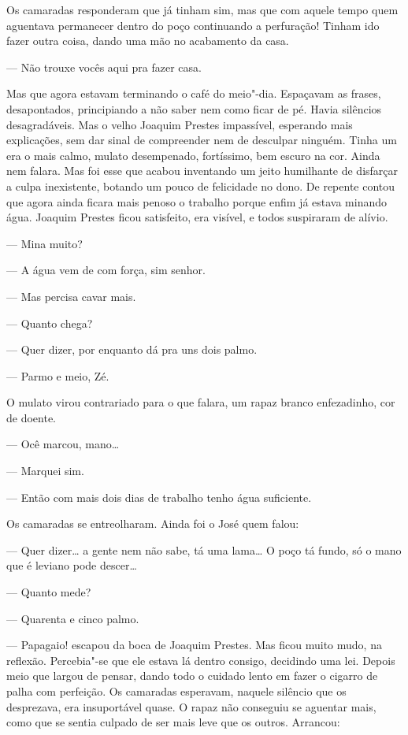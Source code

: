 \begin{linenumbers}
Os camaradas responderam que já tinham sim, mas que com aquele tempo
quem aguentava permanecer dentro do poço continuando a perfuração!
Tinham ido fazer outra coisa, dando uma mão no acabamento da casa.

--- Não trouxe vocês aqui pra fazer casa.

Mas que agora estavam terminando o café do meio"-dia. Espaçavam as
frases, desapontados, principiando a não saber nem como ficar de pé.
Havia silêncios desagradáveis. Mas o velho Joaquim Prestes impassível,
esperando mais explicações, sem dar sinal de compreender nem de
desculpar ninguém. Tinha um era o mais calmo, mulato desempenado,
fortíssimo, bem escuro na cor. Ainda nem falara. Mas foi esse que acabou
inventando um jeito humilhante de disfarçar a culpa inexistente, botando
um pouco de felicidade no dono. De repente contou que agora ainda ficara
mais penoso o trabalho porque enfim já estava minando água. Joaquim
Prestes ficou satisfeito, era visível, e todos suspiraram de alívio.

--- Mina muito?

--- A água vem de com força, sim senhor.

--- Mas percisa cavar mais.

--- Quanto chega?

--- Quer dizer, por enquanto dá pra uns dois palmo.

--- Parmo e meio, Zé.

O mulato virou contrariado para o que falara, um rapaz branco
enfezadinho, cor de doente.

--- Ocê marcou, mano\ldots{}

--- Marquei sim.

--- Então com mais dois dias de trabalho tenho água suficiente.

Os camaradas se entreolharam. Ainda foi o José quem falou:

--- Quer dizer\ldots{} a gente nem não sabe, tá uma lama\ldots{} O poço tá fundo,
só o mano que é leviano pode descer\ldots{}

--- Quanto mede?

--- Quarenta e cinco palmo.

--- Papagaio! escapou da boca de Joaquim Prestes. Mas ficou muito mudo,
na reflexão. Percebia"-se que ele estava lá dentro consigo, decidindo uma
lei. Depois meio que largou de pensar, dando todo o cuidado lento em
fazer o cigarro de palha com perfeição. Os camaradas esperavam, naquele
silêncio que os desprezava, era insuportável quase. O rapaz não
conseguiu se aguentar mais, como que se sentia culpado de ser mais leve
que os outros. Arrancou:


\end{linenumbers}

